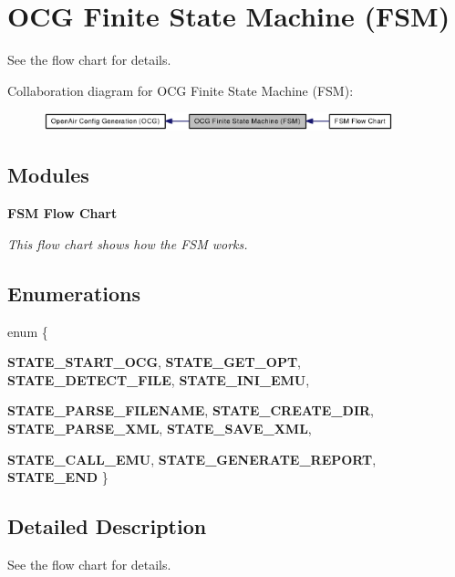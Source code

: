 \section{OCG Finite State Machine (FSM)}
\label{group____enum__fsm}
See the flow chart for details.  




Collaboration diagram for OCG Finite State Machine (FSM):\nopagebreak
\begin{figure}[H]
\begin{center}
\leavevmode
\includegraphics[width=287pt]{group____enum__fsm}
\end{center}
\end{figure}
\subsection*{Modules}
\begin{CompactItemize}
\item 
{\bf FSM Flow Chart}
\begin{CompactList}\small\item\em This flow chart shows how the FSM works. \item\end{CompactList}

\end{CompactItemize}
\subsection*{Enumerations}
\begin{CompactItemize}
\item 
enum \{ \par
{\bf STATE\_\-START\_\-OCG}, 
{\bf STATE\_\-GET\_\-OPT}, 
{\bf STATE\_\-DETECT\_\-FILE}, 
{\bf STATE\_\-INI\_\-EMU}, 
\par
{\bf STATE\_\-PARSE\_\-FILENAME}, 
{\bf STATE\_\-CREATE\_\-DIR}, 
{\bf STATE\_\-PARSE\_\-XML}, 
{\bf STATE\_\-SAVE\_\-XML}, 
\par
{\bf STATE\_\-CALL\_\-EMU}, 
{\bf STATE\_\-GENERATE\_\-REPORT}, 
{\bf STATE\_\-END}
 \}
\end{CompactItemize}


\subsection{Detailed Description}
See the flow chart for details. 

